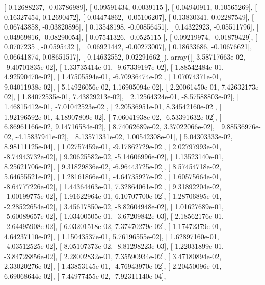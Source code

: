 \documentclass{article}
\begin{document}
       [ 0.12688237, -0.03786989],
       [ 0.09591434,  0.0039115 ],
       [ 0.04940911,  0.10565269],
       [ 0.16327454,  0.12690472],
       [ 0.04474862, -0.05106207],
       [ 0.13830341,  0.02287549],
       [ 0.06743858, -0.03820896],
       [ 0.13548198, -0.00856451],
       [ 0.14322923, -0.05511796],
       [ 0.04969816, -0.08290054],
       [ 0.07541326, -0.0525115 ],
       [ 0.09219974, -0.01879429],
       [ 0.0707235 , -0.0595432 ],
       [ 0.06921442, -0.00273007],
       [ 0.18633686, -0.10676621],
       [ 0.06641874,  0.08651517],
       [ 0.14632552,  0.02291662]]), array([[  3.58717663e-02,  -9.40701835e-02],
       [  1.33735414e-01,  -9.67339197e-02],
       [  1.88542484e-01,   4.92590470e-02],
       [  1.47505594e-01,  -6.70936474e-02],
       [  1.07074371e-01,   9.04011938e-02],
       [  5.14926056e-02,   1.16905094e-02],
       [  2.20061450e-01,   7.42632173e-02],
       [  1.84072535e-01,   7.43829213e-02],
       [  2.12564324e-01,  -8.57588803e-02],
       [  1.46815412e-01,  -7.01042523e-02],
       [  2.20536951e-01,   8.34542160e-02],
       [  1.92196592e-01,   4.18907809e-02],
       [  7.06041938e-02,  -6.53391632e-02],
       [  6.86961166e-02,   9.14716584e-02],
       [  8.74062689e-02,   3.37022066e-02],
       [  9.88536976e-02,  -4.15837941e-02],
       [  8.13571331e-02,   1.00542308e-01],
       [  5.04303333e-02,   8.98111125e-04],
       [  1.02757459e-01,  -9.17862729e-02],
       [  2.02797993e-01,  -8.74943732e-02],
       [  9.20625582e-02,  -5.14606996e-02],
       [  1.13523140e-01,   8.25621706e-02],
       [  9.31829836e-02,  -6.96443725e-02],
       [  8.57454718e-02,   5.64655521e-02],
       [  1.28161866e-01,  -4.64735927e-02],
       [  1.60575664e-01,  -8.64777226e-02],
       [  1.44364463e-01,   7.32864061e-02],
       [  9.31892204e-02,  -1.00199775e-02],
       [  1.91622964e-01,   6.10707700e-02],
       [  1.28706895e-01,  -2.28522654e-02],
       [  3.45617850e-02,  -8.82604948e-02],
       [  1.01627689e-01,  -5.60089657e-02],
       [  1.03400505e-01,  -3.67209842e-03],
       [  2.18562176e-01,  -2.64495908e-02],
       [  6.03201518e-02,   7.37470279e-02],
       [  1.17472379e-01,   4.64237110e-02],
       [  1.15043537e-01,   5.76196555e-02],
       [  1.62897160e-01,  -4.03512525e-02],
       [  8.05107373e-02,  -8.81298223e-03],
       [  1.22031899e-01,  -3.84728856e-02],
       [  2.28002832e-01,   7.35590934e-02],
       [  3.47180894e-02,   2.33020276e-02],
       [  1.43853145e-01,  -4.76943970e-02],
       [  2.20450096e-01,   6.69068644e-02],
       [  7.44977455e-02,  -7.92311140e-04],
\end{document}

